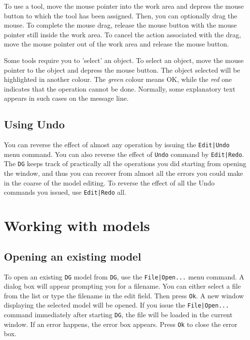\documentclass[a4paper,10pt]{report}
\begin{document}
To use a tool, move the mouse pointer into the work area and depress
the mouse button to which the tool has been assigned. Then, you can
optionally drag the mouse. To complete the mouse drag, release the mouse button
with the mouse pointer still inside the work area. To cancel the
action associated with the drag,
move the mouse pointer out of the work area and release the
mouse button.

Some tools require you to 'select' an object. To select an object,
move the mouse pointer to the object and depress the mouse button. The
object selected will be highlighted in another colour. The {\it green} colour
means OK, while the {\it red} one indicates that the operation cannot be
done. Normally, some explanatory text appears in such cases on the
message line.

\subsection{Using Undo}

You can reverse the effect of almost any operation by issuing the
{\tt Edit|Undo} menu command. You can also reverse the effect of {\tt Undo}
command by {\tt Edit|Redo}. The {\tt DG} keeps track of practically all the
operations you did starting from opening the window, and thus you can
recover from almost all the errors you could make in the coarse of the
model editing. To reverse the effect of all the Undo commands you
issued, use {\tt Edit|Redo} all.

\section{Working with models}

\subsection{Opening an existing model}

To open an existing {\tt DG} model from {\tt DG}, use the {\tt File|Open...} menu
command. A dialog box will appear prompting you for a filename. You
can either select a file from the list or type the filename in the
edit field. Then press {\tt Ok}. A new window displaying the selected model
will be opened. If you issue the {\tt File|Open...} command
immediately after starting {\tt DG}, the file will be loaded in the current
window. If an error happens, the error box appears. Press {\tt Ok} to
close the error box.
\end{document}
